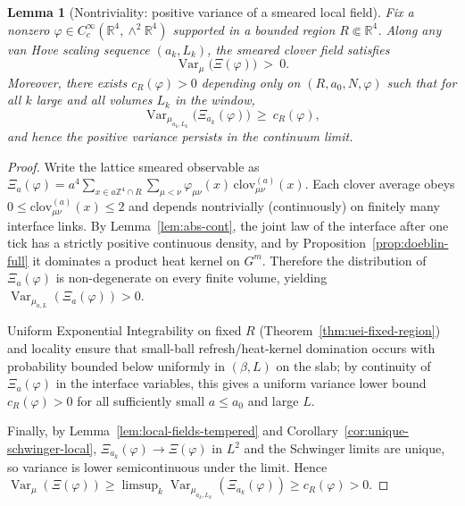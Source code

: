 \documentclass[11pt]{amsart}
\theoremstyle{plain}
\newtheorem{lemma}[theorem]{Lemma}
\theoremstyle{definition}
\theoremstyle{remark}
\begin{document}
\begin{lemma}[Nontriviality: positive variance of a smeared local field]\label{lem:nontrivial-variance}
Fix a nonzero $\varphi\in C_c^\infty(\mathbb R^4,\wedge^2\mathbb R^4)$ supported in a bounded region $R\Subset\mathbb R^4$. Along any van Hove scaling sequence $(a_k,L_k)$, the smeared clover field satisfies
\[
  \operatorname{Var}_\mu\big(\Xi(\varphi)\big)\ >\ 0.
\]
Moreover, there exists $c_R(\varphi)>0$ depending only on $(R,a_0,N,\varphi)$ such that for all $k$ large and all volumes $L_k$ in the window,
\[
  \operatorname{Var}_{\mu_{a_k,L_k}}\big(\Xi_{a_k}(\varphi)\big)\ \ge\ c_R(\varphi),
\]
and hence the positive variance persists in the continuum limit.
\end{lemma}

\begin{proof}
Write the lattice smeared observable as $\Xi_a(\varphi)=a^4\sum_{x\in a\mathbb Z^4\cap R} \sum_{\mu<\nu} \varphi_{\mu\nu}(x)\,\mathrm{clov}^{(a)}_{\mu\nu}(x)$. Each clover average obeys $0\le \mathrm{clov}^{(a)}_{\mu\nu}(x)\le 2$ and depends nontrivially (continuously) on finitely many interface links. By Lemma~\ref{lem:abs-cont}, the joint law of the interface after one tick has a strictly positive continuous density, and by Proposition~\ref{prop:doeblin-full} it dominates a product heat kernel on $G^m$. Therefore the distribution of $\Xi_a(\varphi)$ is non-degenerate on every finite volume, yielding $\operatorname{Var}_{\mu_{a,L}}(\Xi_a(\varphi))>0$.

Uniform Exponential Integrability on fixed $R$ (Theorem~\ref{thm:uei-fixed-region}) and locality ensure that small-ball refresh/heat-kernel domination occurs with probability bounded below uniformly in $(\beta,L)$ on the slab; by continuity of $\Xi_a(\varphi)$ in the interface variables, this gives a uniform variance lower bound $c_R(\varphi)>0$ for all sufficiently small $a\le a_0$ and large $L$.

Finally, by Lemma~\ref{lem:local-fields-tempered} and Corollary~\ref{cor:unique-schwinger-local}, $\Xi_{a_k}(\varphi)\to \Xi(\varphi)$ in $L^2$ and the Schwinger limits are unique, so variance is lower semicontinuous under the limit. Hence $\operatorname{Var}_\mu(\Xi(\varphi))\ge \limsup_k \operatorname{Var}_{\mu_{a_k,L_k}}(\Xi_{a_k}(\varphi))\ge c_R(\varphi)>0$.
\end{proof}
\end{document}
